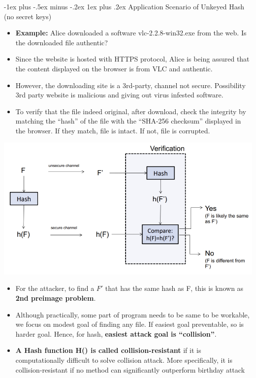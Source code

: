 \documentclass[10pt, landscape]{article}
\makeatletter
\renewcommand{\subsubsection}{\@startsection{subsubsection}{3}{0mm}%
                                {-1ex plus -.5ex minus -.2ex}%
                                {1ex plus .2ex}%
                                {\normalfont\small\bfseries}}
\makeatother
\begin{document}
\begin{multicols*}{3}
\subsubsection{Application Scenario of Unkeyed Hash (no secret keys)}
\begin{itemize}
\item \textbf{Example:} Alice downloaded a software vlc-2.2.8-win32.exe from the web. Is the downloaded file authentic?
\item Since the website is hosted with HTTPS protocol, Alice is being assured that the content displayed on the
browser is from VLC and authentic.
\item However, the downloading site is a 3rd-party, channel not secure. Possibility 3rd party website is malicious and giving out virus infested software.
\item To verify that the file indeed original, after download, check the integrity by matching the “hash” of the file with the “SHA-256 checksum” displayed in the browser. If they match, file is intact. If not, file is corrupted.
\end{itemize}
\centerline{\includegraphics[width=0.7\linewidth]{unkeyedHash}}

\begin{itemize}
\item For the attacker, to find a $F'$ that has the same hash as F, this is known as \textbf{2nd preimage problem}.
\item Although practically, some part of program needs to be same to be workable, we focus on modest goal of finding any file. If easiest goal preventable, so is harder goal. Hence, for hash, \textbf{easiest attack goal is ``collision''}.
\item \textbf{A Hash function H() is called collision-resistant} if it is computationally difficult to 
solve collision attack. More specifically, it is collision-resistant if no method can 
significantly outperform birthday attack
\end{itemize}


\end{multicols*}
\end{document}
